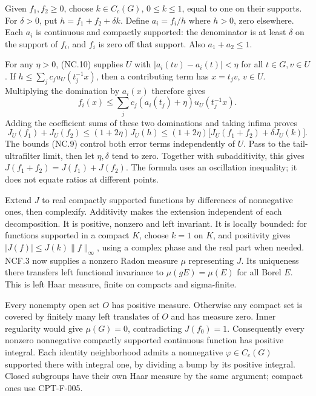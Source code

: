 \documentclass[
  11pt,
]{article}
\begin{document}
Given \(f_1,f_2\geq0\), choose \(k\in C_c(G)\), \(0\leq k\leq1\), equal
to one on their supports. For \(\delta>0\), put \(h=f_1+f_2+\delta k\).
Define \(a_i=f_i/h\) where \(h>0\), zero elsewhere. Each \(a_i\) is
continuous and compactly supported: the denominator is at least
\(\delta\) on the support of \(f_i\), and \(f_i\) is zero off that
support. Also \(a_1+a_2\leq1\).

For any \(\eta>0\), (NC.10) supplies \(U\) with
\(|a_i(tv)-a_i(t)|<\eta\) for all \(t\in G,v\in U\). If
\(h\leq\sum_j c_j u_U(t_j^{-1}x)\), then a contributing term has
\(x=t_jv\), \(v\in U\). Multiplying the domination by \(a_i(x)\)
therefore gives \[
 f_i(x)\leq\sum_j c_j(a_i(t_j)+\eta)u_U(t_j^{-1}x).
\] Adding the coefficient sums of these two dominations and taking
infima proves \[
 J_U(f_1)+J_U(f_2)
 \leq(1+2\eta)J_U(h)
 \leq(1+2\eta)\bigl[J_U(f_1+f_2)+\delta J_U(k)\bigr].       \tag{NC.11}
\] The bounds (NC.9) control both error terms independently of \(U\).
Pass to the tail-ultrafilter limit, then let \(\eta,\delta\) tend to
zero. Together with subadditivity, this gives
\(J(f_1+f_2)=J(f_1)+J(f_2)\). The formula uses an oscillation
inequality; it does not equate ratios at different points.

Extend \(J\) to real compactly supported functions by differences of
nonnegative ones, then complexify. Additivity makes the extension
independent of each decomposition. It is positive, nonzero and left
invariant. It is locally bounded: for functions supported in a compact
\(K\), choose \(k=1\) on \(K\), and positivity gives
\(|J(f)|\leq J(k)\|f\|_\infty\), using a complex phase and the real part
when needed. NCF.3 now supplies a nonzero Radon measure \(\mu\)
representing \(J\). Its uniqueness there transfers left functional
invariance to \(\mu(gE)=\mu(E)\) for all Borel \(E\). This is left Haar
measure, finite on compacts and sigma-finite.

Every nonempty open set \(O\) has positive measure. Otherwise any
compact set is covered by finitely many left translates of \(O\) and has
measure zero. Inner regularity would give \(\mu(G)=0\), contradicting
\(J(f_0)=1\). Consequently every nonzero nonnegative compactly supported
continuous function has positive integral. Each identity neighborhood
admits a nonnegative \(\varphi\in C_c(G)\) supported there with integral
one, by dividing a bump by its positive integral. Closed subgroups have
their own Haar measure by the same argument; compact ones use CPT-F-005.
\end{document}

